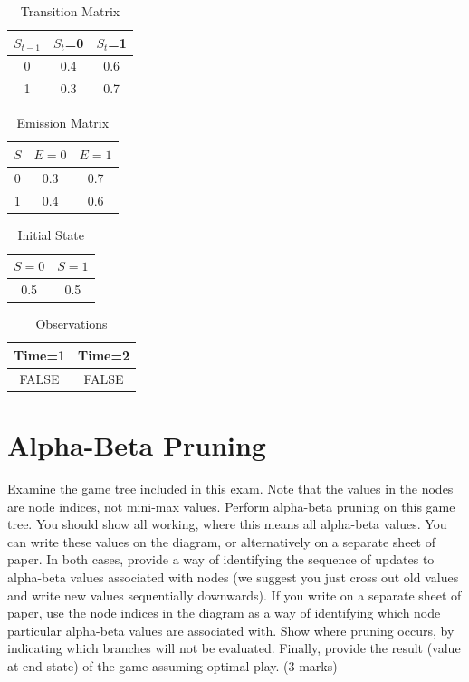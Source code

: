 \documentclass{article}
\begin{document}
\begin{table}[h!]
\caption{Transition Matrix}
\label{hmmvit1}
\begin{center}
\begin{tabular}{ |c||c|c| } 
\hline
 $S_{t-1}$ & $S_t$=0 & $S_t$=1\\
\hline
 0 & 0.4 & 0.6\\
 1 & 0.3 & 0.7\\
\hline
\end{tabular}
\end{center}
\end{table}
\begin{table}[h!]
\caption{Emission Matrix}
\label{hmmvit2}
\begin{center}
\begin{tabular}{ |c||c|c| } 
\hline
 $S$ & $E=0$ & $E=1$\\
\hline
 0 & 0.3 & 0.7\\
 1 & 0.4 & 0.6\\
\hline
\end{tabular}
\end{center}
\end{table}
\begin{table}[h!]
\caption{Initial State}
\label{hmmvit3}
\begin{center}
\begin{tabular}{ |c|c| } 
\hline
 $S=0$ & $S=1$\\
\hline
0.5 & 0.5\\
\hline
\end{tabular}
\end{center}
\end{table}
\begin{table}[h!]
\caption{Observations}
\label{hmmvit4}
\begin{center}
\begin{tabular}{ |c|c| } 
\hline
 Time=1 & Time=2\\
\hline
FALSE & FALSE\\
\hline
\end{tabular}
\end{center}
\end{table}
\clearpage
\section{Alpha-Beta Pruning}

Examine the game tree included in this exam. Note that the values in the nodes are node indices, not mini-max values. Perform alpha-beta pruning on this game tree.  You should show all working, where this means all alpha-beta values.  You can write these values on the diagram, or alternatively on a separate sheet of paper.  In both cases, provide a way of identifying the sequence of updates to alpha-beta values associated with nodes (we suggest you just cross out old values and write new values sequentially downwards).  If you write on a separate sheet of paper, use the node indices in the diagram as a way of identifying which node particular alpha-beta values are associated with.  Show where pruning occurs, by indicating which branches will not be evaluated.  Finally, provide the result (value at end state) of the game assuming optimal play. (3 marks)
\end{document}
